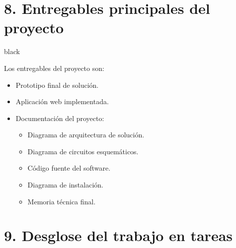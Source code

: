 \documentclass[
11pt, %
codirector, %
]{charter}
\begin{document}
\section{8. Entregables principales del proyecto}
\label{sec:entregables}

\begin{consigna}{black}

Los entregables del proyecto son:

\begin{itemize}
	\item Prototipo final de solución.
	\item Aplicación web implementada.
	\item Documentación del proyecto:
	\begin{itemize}
		\item Diagrama de arquitectura de solución.
		\item Diagrama de circuitos esquemáticos.
		\item Código fuente del software.
		\item Diagrama de instalación.
		\item Memoria técnica final.
	\end{itemize}
	
\end{itemize}

\end{consigna}

\section{9. Desglose del trabajo en tareas}
\label{sec:wbs}
\end{document}
